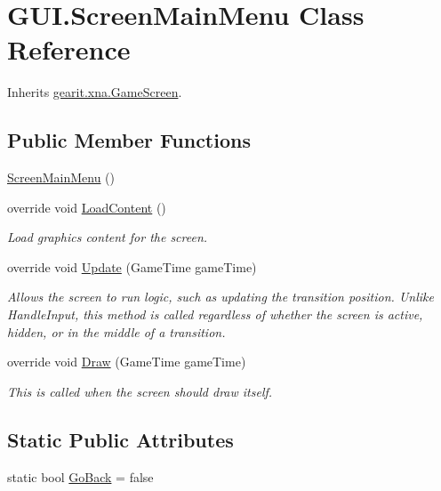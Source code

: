 \hypertarget{class_g_u_i_1_1_screen_main_menu}{\section{G\+U\+I.\+Screen\+Main\+Menu Class Reference}
\label{class_g_u_i_1_1_screen_main_menu}
}


Inherits \hyperlink{classgearit_1_1xna_1_1_game_screen}{gearit.\+xna.\+Game\+Screen}.

\subsection*{Public Member Functions}
\begin{DoxyCompactItemize}
\item 
\hyperlink{class_g_u_i_1_1_screen_main_menu_a0231b3370eb4a483c5af47d858d3f0b6}{Screen\+Main\+Menu} ()
\item 
override void \hyperlink{class_g_u_i_1_1_screen_main_menu_a5cc42d5546fac2f75cd1e4a0fb34456a}{Load\+Content} ()
\begin{DoxyCompactList}\small\item\em Load graphics content for the screen. \end{DoxyCompactList}\item 
override void \hyperlink{class_g_u_i_1_1_screen_main_menu_ac1b887c2b0ec2c9855b7f3f1bd2ad0bf}{Update} (Game\+Time game\+Time)
\begin{DoxyCompactList}\small\item\em Allows the screen to run logic, such as updating the transition position. Unlike Handle\+Input, this method is called regardless of whether the screen is active, hidden, or in the middle of a transition. \end{DoxyCompactList}\item 
override void \hyperlink{class_g_u_i_1_1_screen_main_menu_a31f0a47c73d0807cedb2688bcdc39d9e}{Draw} (Game\+Time game\+Time)
\begin{DoxyCompactList}\small\item\em This is called when the screen should draw itself. \end{DoxyCompactList}\end{DoxyCompactItemize}
\subsection*{Static Public Attributes}
\begin{DoxyCompactItemize}
\item 
static bool \hyperlink{class_g_u_i_1_1_screen_main_menu_a69efd8b9aa3aa8716ddb37e0a00a5e2b}{Go\+Back} = false
\end{DoxyCompactItemize}

